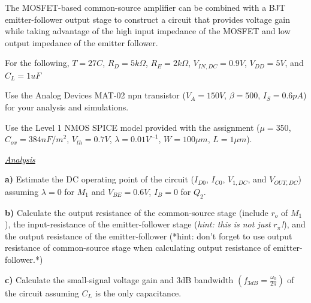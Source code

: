 \documentclass[11pt]{article}
\begin{document}
\vspace{1em}

\noindent The MOSFET-based common-source amplifier can be combined with a BJT emitter-follower output stage to construct a circuit that provides voltage gain while taking advantage of the high input impedance of the MOSFET and low output impedance of the emitter follower.

\vspace{1em}

\noindent For the following, $T = 27C$, $R_D = 5k\Omega$, $R_E = 2k\Omega$, $V_{IN,DC} = 0.9V$, $V_{DD} = 5V$, and $C_L = 1uF$

\vspace{1em}

\noindent Use the Analog Devices MAT-02 npn transistor ($V_A = 150V$, $\beta = 500$, $I_S = 0.6pA$) for your analysis and simulations.

\vspace{1em}

\noindent Use the Level 1 NMOS SPICE model provided with the assignment ($\mu = 350$, $C_{ox} = 384nF/m^2$, $V_{th} = 0.7V$, $\lambda = 0.01V^{-1}$, $W = 100\mu m$, $L = 1\mu m$).

\vspace{2em}

\noindent \underline{\textit{Analysis}}

\vspace{1em}

\noindent \textbf{a)} Estimate the DC operating point of the circuit ($I_{D0}$, $I_{C0}$, $V_{1,DC}$, and $V_{OUT,DC}$) assuming $\lambda = 0$ for $M_1$ and $V_{BE} = 0.6V$, $I_B = 0$ for $Q_2$.

\vspace{1.5em}

\noindent \textbf{b)} Calculate the output resistance of the common-source stage (include $r_o$ of $M_1$), the input-resistance of the emitter-follower stage (\textit{hint: this is not just }$r_\pi$\textit{!}), and the output resistance of the emitter-follower (*hint: don't forget to use output resistance of common-source stage when calculating output resistance of emitter-follower.*)

\vspace{1.5em}

\noindent \textbf{c)} Calculate the small-signal voltage gain and 3dB bandwidth $\left( f_{3dB} = \frac{\omega_0}{2\pi} \right)$ of the circuit assuming $C_L$ is the only capacitance.
\end{document}
